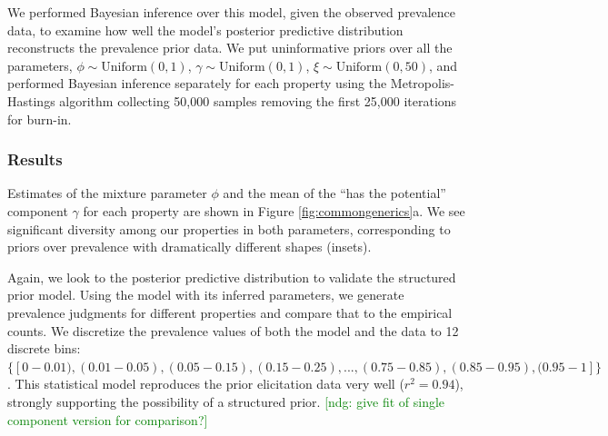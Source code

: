 \documentclass[12pt,letterpaper]{article}
\newcommand{\ndg}[1]{\textcolor{Green}{[ndg: #1]}}
\newcommand{\mht}[1]{\textcolor{Blue}{[mht: #1]}}
\begin{document}
We performed Bayesian inference over this model, given the observed prevalence data, to examine how well the model's posterior predictive distribution reconstructs the prevalence prior data.
We put uninformative priors over all the parameters, $\phi \sim \text{Uniform}(0,1)$, 
$\gamma \sim \text{Uniform}(0,1)$, $\xi \sim \text{Uniform}(0, 50)$, 
and performed Bayesian inference separately for each property using the Metropolis-Hastings algorithm 
collecting 50,000 samples removing the first 25,000 iterations for burn-in.

\subsubsection*{Results}


Estimates of the mixture parameter $\phi$ and the mean of the ``has the potential'' component $\gamma$ for each property are shown in Figure \ref{fig:commongenerics}a.
We see significant diversity among our properties in both parameters, corresponding to priors over prevalence with dramatically different shapes (insets). 

Again, we look to the posterior predictive distribution to validate the structured prior model.
Using the model with its inferred parameters, we generate prevalence judgments for different properties and compare that to the empirical counts. 
We discretize the prevalence values of both the model and the data to 12 discrete bins: $\{[0-0.01), (0.01-0.05), (0.05-0.15), (0.15-0.25),  ..., (0.75-0.85), (0.85-0.95), (0.95-1]\}$.
This statistical model reproduces the prior elicitation data very well ($r^2 = 0.94$), strongly supporting the possibility of a structured prior. 
\ndg{give fit of single component version for comparison?}
\end{document}
